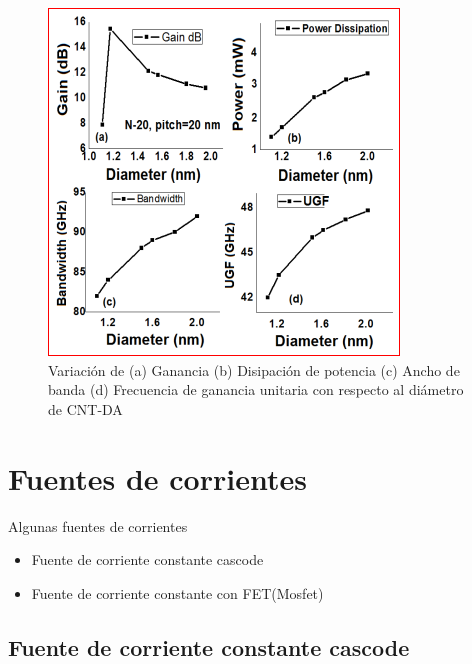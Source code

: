 \documentclass[aspectratio=169, 8pt]{beamer}
\begin{document}
\begin{frame}
\begin{figure}[!h] 
	\centering
	\includegraphics[scale=0.8]{IMAGENES/6.PNG}
	\caption{Variación de (a) Ganancia (b) Disipación de potencia (c) Ancho de banda (d) Frecuencia de ganancia unitaria con respecto al diámetro de CNT-DA \cite{Akhoon}}
\end{figure}
\end{frame}



\section{Fuentes de corrientes}
\begin{frame}{Algunas fuentes de corrientes}
\begin{itemize}
	\item Fuente de corriente constante cascode
	\item Fuente de corriente constante con FET(Mosfet)
\end{itemize}
\end{frame}

\subsection{Fuente de corriente constante cascode}
\end{document}
